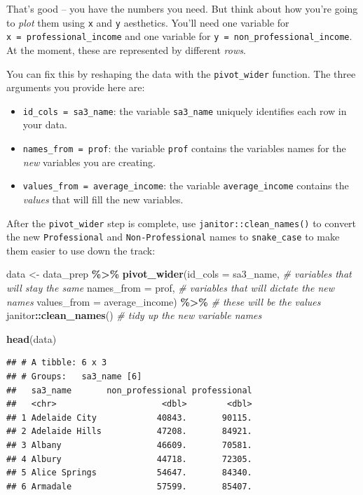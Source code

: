 \documentclass[
]{book}
\newenvironment{Shaded}{\begin{snugshade}}{\end{snugshade}}
\newcommand{\CommentTok}[1]{\textcolor[rgb]{0.56,0.35,0.01}{\textit{#1}}}
\newcommand{\DataTypeTok}[1]{\textcolor[rgb]{0.13,0.29,0.53}{#1}}
\newcommand{\KeywordTok}[1]{\textcolor[rgb]{0.13,0.29,0.53}{\textbf{#1}}}
\newcommand{\NormalTok}[1]{#1}
\newcommand{\OperatorTok}[1]{\textcolor[rgb]{0.81,0.36,0.00}{\textbf{#1}}}
\newcommand{\StringTok}[1]{\textcolor[rgb]{0.31,0.60,0.02}{#1}}
\providecommand{\tightlist}{%
  \setlength{\itemsep}{0pt}\setlength{\parskip}{0pt}}
\begin{document}
That's good -- you have the numbers you need. But think about how you're going to \emph{plot} them using \texttt{x} and \texttt{y} aesthetics. You'll need one variable for \texttt{x\ =\ professional\_income} and one variable for \texttt{y\ =\ non\_professional\_income}. At the moment, these are represented by different \emph{rows}.

You can fix this by reshaping the data with the \texttt{pivot\_wider} function. The three arguments you provide here are:

\begin{itemize}
\tightlist
\item
  \texttt{id\_cols\ =\ sa3\_name}: the variable \texttt{sa3\_name} uniquely identifies each row in your data.
\item
  \texttt{names\_from\ =\ prof}: the variable \texttt{prof} contains the variables names for the \emph{new} variables you are creating.
\item
  \texttt{values\_from\ =\ average\_income}: the variable \texttt{average\_income} contains the \emph{values} that will fill the new variables.
\end{itemize}

After the \texttt{pivot\_wider} step is complete, use \texttt{janitor::clean\_names()} to convert the new \texttt{Professional} and \texttt{Non-Professional} names to \texttt{snake\_case} to make them easier to use down the track:

\begin{Shaded}
\begin{Highlighting}[]
\NormalTok{data \textless{}{-}}\StringTok{ }\NormalTok{data\_prep }\OperatorTok{\%\textgreater{}\%}\StringTok{ }
\StringTok{  }\KeywordTok{pivot\_wider}\NormalTok{(}\DataTypeTok{id\_cols =}\NormalTok{ sa3\_name,  }\CommentTok{\# variables that will stay the same}
              \DataTypeTok{names\_from =}\NormalTok{ prof,   }\CommentTok{\# variables that will dictate the new names}
              \DataTypeTok{values\_from =}\NormalTok{ average\_income) }\OperatorTok{\%\textgreater{}\%}\StringTok{  }\CommentTok{\# these will be the values}
\StringTok{  }\NormalTok{janitor}\OperatorTok{::}\KeywordTok{clean\_names}\NormalTok{() }\CommentTok{\# tidy up the new variable names}

\KeywordTok{head}\NormalTok{(data)}
\end{Highlighting}
\end{Shaded}

\begin{verbatim}
## # A tibble: 6 x 3
## # Groups:   sa3_name [6]
##   sa3_name       non_professional professional
##   <chr>                     <dbl>        <dbl>
## 1 Adelaide City            40843.       90115.
## 2 Adelaide Hills           47208.       84921.
## 3 Albany                   46609.       70581.
## 4 Albury                   44718.       72305.
## 5 Alice Springs            54647.       84340.
## 6 Armadale                 57599.       85407.
\end{verbatim}
\end{document}
